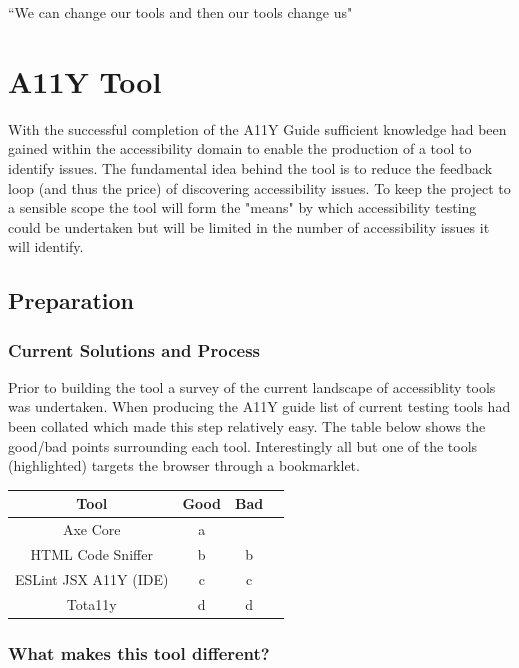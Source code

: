 \begin{savequote}[75mm]
``We can change our tools and then our tools change us"
\end{savequote}

\chapter{A11Y Tool}
With the successful completion of the A11Y Guide sufficient knowledge had
been gained within the accessibility domain to enable the production of a
tool to identify issues. The fundamental idea behind the tool is to reduce
the feedback loop (and thus the price) of discovering accessibility issues. To
keep the project to a sensible scope the tool will form the "means" by which
accessibility testing could be undertaken but will be limited in the number
of accessibility issues it will identify.
\section{Preparation}

\subsection{Current Solutions and Process}
Prior to building the tool a survey of the current landscape of
accessiblity tools was undertaken. When producing the A11Y guide list of
current testing tools had been collated which made this step relatively easy.
The table below shows the good/bad points surrounding each tool.
Interestingly all but one of the tools (highlighted) targets the browser
through a bookmarklet.

\begin{table}[h!]
\centering
\begin{tabular}{ |c|c|c|c| }
 \hline
 Tool & Good & Bad  \\
 \hline
 \hline
 Axe Core  & a \\
 \hline
 HTML Code Sniffer & b & b \\
 \hline
 ESLint JSX A11Y (IDE) & c & c \\
 \hline
 Tota11y & d & d \\
 \hline
\end{tabular}
\end{table}

\subsection{What makes this tool different?}


